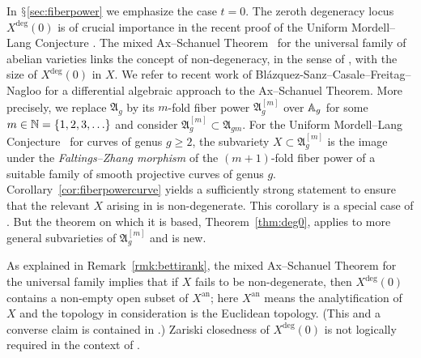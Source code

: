 \documentclass[12pt,oneside]{amsart}
\begin{document}
In $\mathsection$\ref{sec:fiberpower} we emphasize
the case $t=0$.
The zeroth degeneracy locus $X^{\mathrm{deg}}(0)$ is of crucial importance in the
recent proof of the Uniform Mordell--Lang Conjecture \cite{DGHUnifML,
  KuehneUnifMM, UnifML}.
The mixed Ax--Schanuel
Theorem~\cite{GaoMixedAS} for the universal family of abelian
varieties
links the concept of non-degeneracy, in the sense of
\cite[Definition~1.5]{DGHUnifML}, 
with the size of $X^{\mathrm{deg}}(0)$ in $X$.
We 
refer to recent work of Bl\'azquez-Sanz--Casale--Freitag--Nagloo
\cite{BCFN:AxSchanuelI}
for a differential algebraic approach to the Ax--Schanuel Theorem.
More precisely, we replace $\mathfrak{A}_{g}$ by its
$m$-fold fiber power $\mathfrak{A}_{g}^{[m]}$ over ${\mathbb{A}}_g$ for some
$m\in{\mathbb{N}}=\{1,2,3,\ldots\}$ and consider
$\mathfrak{A}_g^{[m]}\subset\mathfrak{A}_{gm}$.  For the
Uniform Mordell--Lang Conjecture~\cite{DGHUnifML} for curves of genus $g\ge
2$, the subvariety $X\subset\mathfrak{A}_g^{[m]}$ is the image under
the \textit{Faltings--Zhang morphism} of the $(m+1)$-fold
 fiber
power of a suitable family of smooth projective curves of genus $g$.
Corollary~\ref{cor:fiberpowercurve} yields a sufficiently strong
statement to ensure that the relevant $X$ arising in \cite{DGHUnifML}
is non-degenerate. This corollary is a special case of \cite[Theorem~1.3]{GaoBettiRank}. But the theorem on which it is based,
Theorem~\ref{thm:deg0}, applies to more general subvarieties of
$\mathfrak{A}_g^{[m]}$ and is new.

As explained in Remark~\ref{rmk:bettirank}, the mixed Ax--Schanuel
Theorem for the universal family implies that if $X$ fails to be
non-degenerate, then $X^{\mathrm{deg}}(0)$ contains a non-empty open
subset of $X^{\mathrm{an}}$; here $X^{\mathrm{an}}$ means the
analytification of $X$ and the topology in consideration is the
Euclidean topology. (This and a converse claim is contained in
\cite[Theorem~1.7]{GaoBettiRank}.) Zariski closedness of
$X^{\mathrm{deg}}(0)$ is not logically required in the context of
\cite{DGHUnifML, KuehneUnifMM, UnifML}.
\end{document}

